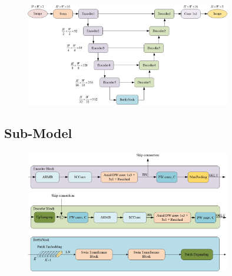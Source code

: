 \documentclass[CJK,aspectratio=169]{beamer}  %
\begin{document}
	\begin{frame}
		\begin{figure}[htbp]
			\begin{center}
				\includegraphics[width=0.8\textwidth]{picture/LLIE/My Architecture/ULite_Enhance}
			\end{center}
		\end{figure}
		
	\end{frame}
	
	\subsection{Sub-Model}
	
	\begin{frame}
		
		\begin{figure}[htbp]
			\begin{center}
				\includegraphics[width=0.8\textwidth]{picture/LLIE/My Architecture/Encoder_Decoder}
			\end{center}
		\end{figure}

	\end{frame}
	
\end{document}
